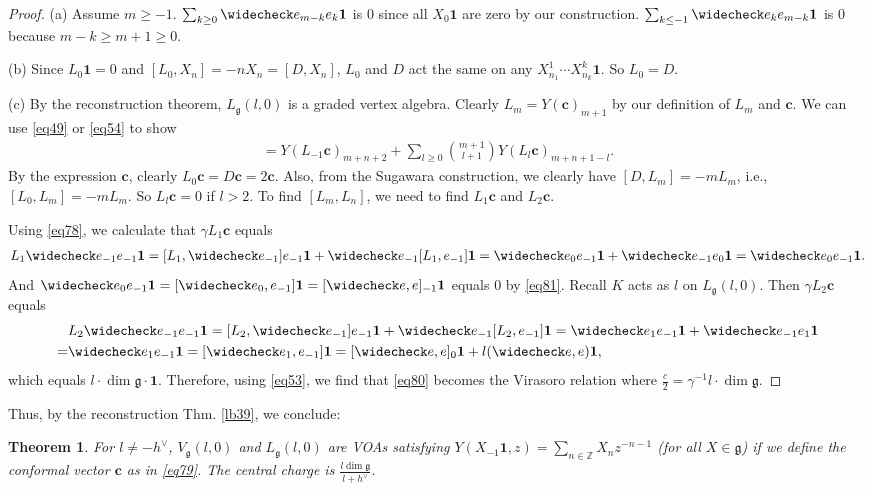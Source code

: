 \documentclass[11pt,b5paper,notitlepage]{article}
\theoremstyle{definition}
\theoremstyle{plain}
\newtheorem{thm}[df]{Theorem}
\newcommand{\wch}{\widecheck}
\newcommand{\id}{\mathbf{1}}
\newcommand{\gk}{\mathfrak g}
\newcommand{\Zbb}{\mathbb Z}
\newcommand{\cbf}{\mathbf c}
\numberwithin{equation}{section}
\begin{document}
\begin{proof}
(a) Assume $m\geq-1$.  $\sum_{k\geq0}\wch e_{m-k}e_k\id$ is $0$ since all $X_0\id$ are zero by our construction. 	$\sum_{k\leq-1}\wch e_k e_{m-k}\id$ is $0$ because $m-k\geq m+1\geq0$.

(b) Since $L_0\id=0$ and $[L_0,X_n]=-nX_n=[D,X_n]$,  $L_0$ and $D$ act the same on any $X^1_{n_1}\cdots X^k_{n_k}\id$. So $L_0=D$.

(c) By the reconstruction theorem, $L_\gk(l,0)$ is a graded vertex algebra. Clearly $L_m=Y(\cbf)_{m+1}$ by our definition of $L_m$ and $\cbf$. We can use \eqref{eq49} or \eqref{eq54} to show
\begin{align}
[L_m,L_n]=Y(L_{-1}\cbf)_{m+n+2}+\sum_{l\geq 0}{m+1\choose l+1}Y(L_l\cbf)_{m+n+1-l}. \label{eq80}
\end{align}
By the expression $\cbf$, clearly $L_0\cbf=D\cbf=2\cbf$. Also, from the Sugawara construction, we clearly have $[D,L_m]=-mL_m$, i.e., $[L_0,L_m]=-mL_m$. So $L_l\cbf=0$ if $l>2$. To find $[L_m,L_n]$, we need to find $L_1\cbf$ and $L_2\cbf$.

Using \eqref{eq78}, we calculate that $\gamma L_1\cbf$ equals
\begin{align*}
L_1\wch e_{-1}e_{-1}\id=[L_1,\wch e_{-1}]e_{-1}\id+\wch e_{-1}[L_1,e_{-1}]\id=\wch e_0e_{-1}\id+\wch e_{-1}e_0\id=\wch e_0 e_{-1}\id.	
\end{align*}
And $\wch e_0e_{-1}\id=[\wch e_0,e_{-1}]\id=[\wch e,e]_{-1}\id$ equals $0$ by \eqref{eq81}. Recall $K$ acts as $l$ on $L_\gk(l,0)$. Then $\gamma L_2\cbf$ equals
\begin{align*}
&L_2\wch e_{-1}e_{-1}\id=[L_2,\wch e_{-1}]e_{-1}\id+\wch e_{-1}[L_2,e_{-1}]\id=\wch e_1e_{-1}\id+\wch e_{-1}e_1\id\\
=&	\wch e_1e_{-1}\id=[\wch e_1,e_{-1}]\id=[\wch e,e]_0\id+l(\wch e,e)\id,
\end{align*}
which equals $l\cdot \dim \gk\cdot \id$. Therefore, using \eqref{eq53}, we find that \eqref{eq80} becomes the Virasoro relation where $\frac c{2}=\gamma^{-1}l\cdot\dim\gk$.
\end{proof}

Thus, by the reconstruction Thm. \ref{lb39}, we conclude:

\begin{thm}
For $l\neq -h^\vee$, $V_\gk(l,0)$ and $L_\gk(l,0)$ are VOAs satisfying $Y(X_{-1}\id,z)=\sum_{n\in\Zbb}X_nz^{-n-1}$ (for all $X\in\gk$) if we define the conformal vector $\cbf$ as in \eqref{eq79}. The central charge is $\frac{l\dim\gk}{l+h^\vee}$.
\end{thm}	
\end{document}
